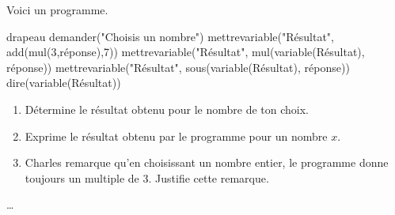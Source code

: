 \begin{exercice*}
    Voici un programme.

    \begin{Scratch}[Echelle=0.9]
        drapeau
        demander("Choisis un nombre")
        mettrevariable("Résultat", add(mul(3,réponse),7))
        mettrevariable("Résultat", mul(variable(Résultat), réponse))
        mettrevariable("Résultat", sous(variable(Résultat), réponse))
        dire(variable(Résultat))
    \end{Scratch}
    \begin{enumerate}
        \item Détermine le résultat obtenu pour le nombre de ton choix.
        \item Exprime le résultat obtenu par le programme pour un nombre $x$.
        \item Charles remarque qu'en choisissant un nombre entier, le programme donne toujours un multiple de 3. Justifie cette remarque.
    \end{enumerate}
\end{exercice*}
\begin{corrige}
    \dots
\end{corrige}

